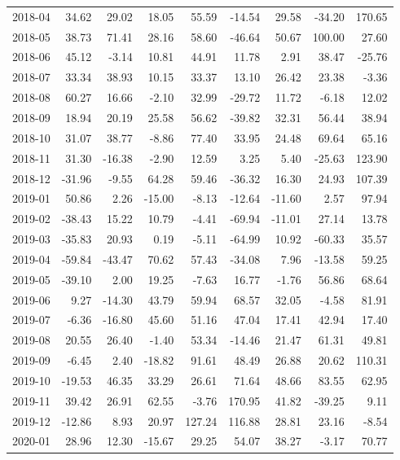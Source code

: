 \begin{table}[ht]
\begin{tabular}{lrrrrrrrr}
  2018-04 & 34.62 & 29.02 & 18.05 & 55.59 & -14.54 & 29.58 & -34.20 & 170.65 \\ 
  2018-05 & 38.73 & 71.41 & 28.16 & 58.60 & -46.64 & 50.67 & 100.00 & 27.60 \\ 
  2018-06 & 45.12 & -3.14 & 10.81 & 44.91 & 11.78 & 2.91 & 38.47 & -25.76 \\ 
  2018-07 & 33.34 & 38.93 & 10.15 & 33.37 & 13.10 & 26.42 & 23.38 & -3.36 \\ 
  2018-08 & 60.27 & 16.66 & -2.10 & 32.99 & -29.72 & 11.72 & -6.18 & 12.02 \\ 
  2018-09 & 18.94 & 20.19 & 25.58 & 56.62 & -39.82 & 32.31 & 56.44 & 38.94 \\ 
  2018-10 & 31.07 & 38.77 & -8.86 & 77.40 & 33.95 & 24.48 & 69.64 & 65.16 \\ 
  2018-11 & 31.30 & -16.38 & -2.90 & 12.59 & 3.25 & 5.40 & -25.63 & 123.90 \\ 
  2018-12 & -31.96 & -9.55 & 64.28 & 59.46 & -36.32 & 16.30 & 24.93 & 107.39 \\ 
  2019-01 & 50.86 & 2.26 & -15.00 & -8.13 & -12.64 & -11.60 & 2.57 & 97.94 \\ 
  2019-02 & -38.43 & 15.22 & 10.79 & -4.41 & -69.94 & -11.01 & 27.14 & 13.78 \\ 
  2019-03 & -35.83 & 20.93 & 0.19 & -5.11 & -64.99 & 10.92 & -60.33 & 35.57 \\ 
  2019-04 & -59.84 & -43.47 & 70.62 & 57.43 & -34.08 & 7.96 & -13.58 & 59.25 \\ 
  2019-05 & -39.10 & 2.00 & 19.25 & -7.63 & 16.77 & -1.76 & 56.86 & 68.64 \\ 
  2019-06 & 9.27 & -14.30 & 43.79 & 59.94 & 68.57 & 32.05 & -4.58 & 81.91 \\ 
  2019-07 & -6.36 & -16.80 & 45.60 & 51.16 & 47.04 & 17.41 & 42.94 & 17.40 \\ 
  2019-08 & 20.55 & 26.40 & -1.40 & 53.34 & -14.46 & 21.47 & 61.31 & 49.81 \\ 
  2019-09 & -6.45 & 2.40 & -18.82 & 91.61 & 48.49 & 26.88 & 20.62 & 110.31 \\ 
  2019-10 & -19.53 & 46.35 & 33.29 & 26.61 & 71.64 & 48.66 & 83.55 & 62.95 \\ 
  2019-11 & 39.42 & 26.91 & 62.55 & -3.76 & 170.95 & 41.82 & -39.25 & 9.11 \\ 
  2019-12 & -12.86 & 8.93 & 20.97 & 127.24 & 116.88 & 28.81 & 23.16 & -8.54 \\ 
  2020-01 & 28.96 & 12.30 & -15.67 & 29.25 & 54.07 & 38.27 & -3.17 & 70.77 \\ 

\end{tabular}
\end{table}
